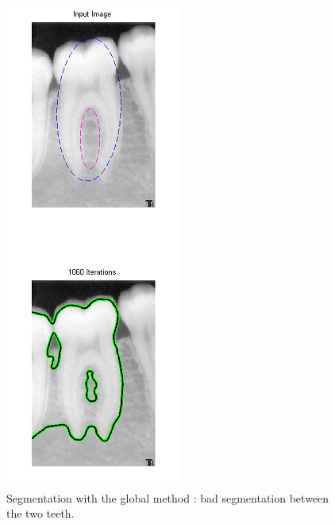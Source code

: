 \begin{figure}[H]
\centering
\includegraphics[scale=0.8]{images/doubleEllipseTest_rx2_region.png}
\caption{Segmentation with the global method : bad segmentation between the two teeth.}
\end{figure}




